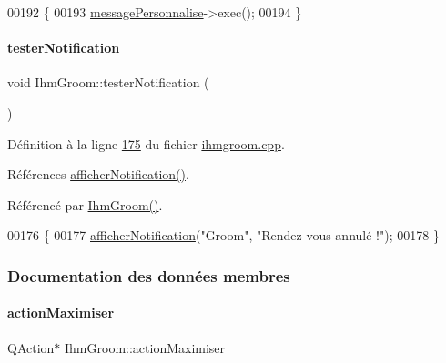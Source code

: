\begin{DoxyCode}
00192 \{
00193     \hyperlink{class_ihm_groom_a529729b93d7b8d17147d3b47fe9a274d}{messagePersonnalise}->exec();
00194 \}
\end{DoxyCode}
\mbox{\label{class_ihm_groom_a53838a4bd054fe5c85c23eced3eacc8b}} 
\paragraph{\texorpdfstring{tester\+Notification}{testerNotification}}
{\footnotesize\ttfamily void Ihm\+Groom\+::tester\+Notification (\begin{DoxyParamCaption}{ }\end{DoxyParamCaption})\hspace{0.3cm}{\ttfamily [slot]}}



Définition à la ligne \hyperlink{ihmgroom_8cpp_source_l00175}{175} du fichier \hyperlink{ihmgroom_8cpp_source}{ihmgroom.\+cpp}.



Références \hyperlink{ihmgroom_8cpp_source_l00151}{afficher\+Notification()}.



Référencé par \hyperlink{ihmgroom_8cpp_source_l00031}{Ihm\+Groom()}.


\begin{DoxyCode}
00176 \{
00177     \hyperlink{class_ihm_groom_a55194db52eca3648aad391274a6bb709}{afficherNotification}(\textcolor{stringliteral}{"Groom"}, \textcolor{stringliteral}{"Rendez-vous annulé !"});
00178 \}
\end{DoxyCode}


\subsubsection{Documentation des données membres}
\mbox{\label{class_ihm_groom_aa23dc46d5e223aa20bb84b5bd99d3b81}} 
\paragraph{\texorpdfstring{action\+Maximiser}{actionMaximiser}}
{\footnotesize\ttfamily Q\+Action$\ast$ Ihm\+Groom\+::action\+Maximiser\hspace{0.3cm}{\ttfamily [private]}}



